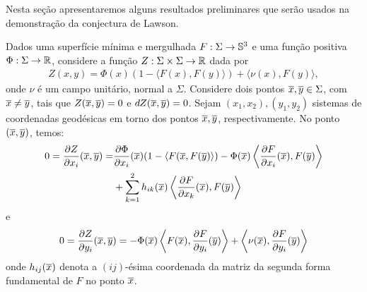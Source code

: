 %

Nesta se\c c\~ao apresentaremos alguns resultados preliminares
que ser\~ao usados na demonstra\c c\~ao da conjectura de
Lawson. 

\vspace{.2cm}

Dados uma superfície mínima e mergulhada $F:\Sigma\to\mathbb{S}^3$ 
e uma função positiva $\Phi: \Sigma\to\mathbb R$, considere a função 
$Z:\Sigma\times\Sigma\to\mathbb R$ dada por
\begin{eqnarray}\label{eq:funcaoZ}
Z(x,y) = \Phi(x) (1 - \langle F(x), F(y) \rangle) + \langle \nu(x), F(y) \rangle,
\end{eqnarray}
onde $\nu$ \'e um campo unitário, normal a $\Sigma$. Considere dois 
pontos $\overline{x}, \overline{y} \in \Sigma$, com $\overline{x} \neq \overline{y}$, tais que $Z(\overline{x}, \overline{y}) = 0$ e $dZ(\overline{x}, \overline{y}) = 0$. Sejam $(x_1,x_2), (y_1,y_2)$ sistemas de coordenadas geodésicas em torno dos pontos $\overline{x}, \overline{y}$, respectivamente. No ponto $(\overline{x},\overline{y})$, temos:
\begin{eqnarray}\label{diff_Z_x}
\begin{aligned}
0 = \frac{\partial Z}{\partial x_i} (\overline{x}, \overline{y}) = &
\frac{\partial \Phi}{\partial x_i}(\overline{x}) (1 - \langle F(\overline{x}, F(\overline{y}) \rangle) -  
\Phi(\overline{x}) \left\langle \frac{\partial F}{\partial x_i}(\overline{x}), F(\overline{y}) \right\rangle \\ & + \sum_{k=1}^{2} h_{ik}(\overline{x}) \left\langle \frac{\partial F}{\partial x_k}(\overline{x}), F(\overline{y}) \right\rangle
\end{aligned}
\end{eqnarray}
e
\begin{equation}\label{diff_Z_y}
0 = \frac{\partial Z}{\partial y_i} (\overline{x}, \overline{y}) = - \Phi(\overline{x}) \left\langle F(\overline{x}), \frac{\partial F}{\partial y_i} (\overline{y}) \right\rangle + \left\langle \nu(\overline{x}), \frac{\partial F}{\partial y_i}(\overline{y}) \right\rangle
\end{equation}
onde $h_{ij}(\overline{x})$ denota a $(ij)$-ésima coordenada da matriz da segunda forma fundamental de $F$ no ponto $\overline{x}$.

